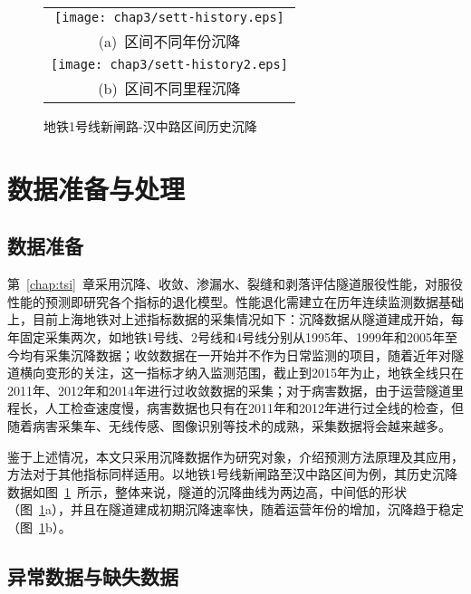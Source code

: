 \begin{figure}[htb!] 
    \centering 
    \begin{tabular}{c} 
        \texttt{[image: chap3/sett-history.eps]} \\ 
        (a)~区间不同年份沉降 \\
        \texttt{[image: chap3/sett-history2.eps]} \\ 
        (b)~区间不同里程沉降 \\
    \end{tabular}
    \caption{地铁1号线新闸路-汉中路区间历史沉降} 
    \label{fig:地铁1号线新闸路-汉中路区间历史沉降} 
\end{figure}

\section{数据准备与处理}

\subsection{数据准备}

第~\ref{chap:tsi}~章采用沉降、收敛、渗漏水、裂缝和剥落评估隧道服役性能，对服役性能的预测即研究各个指标的退化模型。性能退化需建立在历年连续监测数据基础上，目前上海地铁对上述指标数据的采集情况如下：沉降数据从隧道建成开始，每年固定采集两次，如地铁1号线、2号线和4号线分别从1995年、1999年和2005年至今均有采集沉降数据；收敛数据在一开始并不作为日常监测的项目，随着近年对隧道横向变形的关注，这一指标才纳入监测范围，截止到2015年为止，地铁全线只在2011年、2012年和2014年进行过收敛数据的采集；对于病害数据，由于运营隧道里程长，人工检查速度慢，病害数据也只有在2011年和2012年进行过全线的检查，但随着病害采集车、无线传感、图像识别等技术的成熟，采集数据将会越来越多。

鉴于上述情况，本文只采用沉降数据作为研究对象，介绍预测方法原理及其应用，方法对于其他指标同样适用。以地铁1号线新闸路至汉中路区间为例，其历史沉降数据如图~\ref{fig:地铁1号线新闸路-汉中路区间历史沉降}~所示，整体来说，隧道的沉降曲线为两边高，中间低的形状（图~\ref{fig:地铁1号线新闸路-汉中路区间历史沉降}a），并且在隧道建成初期沉降速率快，随着运营年份的增加，沉降趋于稳定（图~\ref{fig:地铁1号线新闸路-汉中路区间历史沉降}b）。


\subsection{异常数据与缺失数据}

